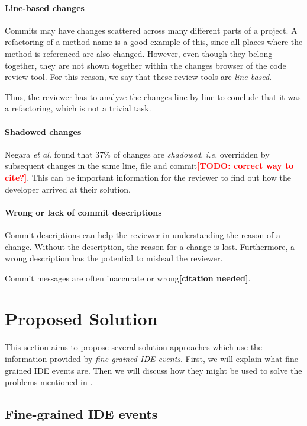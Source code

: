 \documentclass[conference,a4paper]{IEEEtran}
\newcommand{\citeneeded}{\textbf{{[}citation needed{]}}}
\newcommand{\todo}[1]{\textbf{\textcolor{red}{{[}TODO: #1{]}}}}
\begin{document}
\paragraph{Line-based changes}

Commits may have changes scattered across many different parts of a
project. A refactoring of a method name is a good example of this,
since all places where the method is referenced are also
changed. However, even though they belong together, they are not shown
together within the changes browser of the code review tool. For this
reason, we say that these review tools are \textit{line-based}.

Thus, the reviewer has to analyze the changes line-by-line to conclude
that it was a refactoring, which is not a trivial task.

\paragraph{Shadowed changes}

Negara \textit{et al.} found that 37\% of changes are
\textit{shadowed}, \textit{i.e.} overridden by subsequent changes in
the same line, file and commit\cite{Nega12a}\todo{correct way to
  cite?}. This can be important information for the reviewer to find
out how the developer arrived at their solution.

\paragraph{Wrong or lack of commit descriptions}

Commit descriptions can help the reviewer in understanding the reason
of a change. Without the description, the reason for a change is
lost. Furthermore, a wrong description has the potential to mislead
the reviewer.

Commit messages are often inaccurate or wrong\citeneeded{}.

\section{Proposed Solution}
\label{sec:proposed-solution}
This section aims to propose several solution approaches which use the
information provided by \textit{fine-grained IDE events}. First, we
will explain what fine-grained IDE events are. Then we will discuss
how they might be used to solve the problems mentioned in
.

\subsection{Fine-grained IDE events}
\label{sec:fine-grained-ide}
\end{document}
